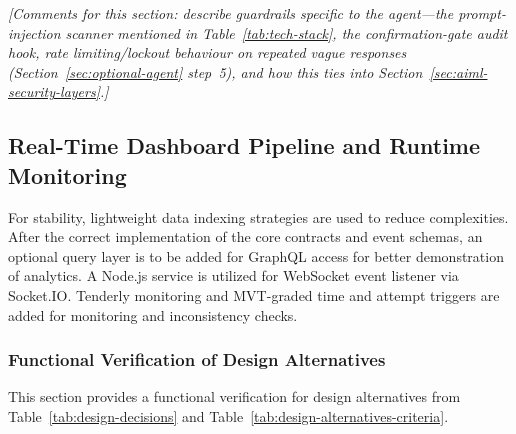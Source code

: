 \documentclass[12pt,a4paper]{report}
\begin{document}
\vspace{1.5cm}
\noindent\textit{[Comments for this section: describe guardrails specific to the agent---the prompt-injection scanner mentioned in Table~\ref{tab:tech-stack}, the confirmation-gate audit hook, rate limiting/lockout behaviour on repeated vague responses (Section~\ref{sec:optional-agent} step~5), and how this ties into Section~\ref{sec:aiml-security-layers}.]}
\vspace{1.5cm}


\subsection{Real-Time Dashboard Pipeline and Runtime Monitoring}
\label{sec:realtime}

For stability, lightweight data indexing strategies are used to reduce complexities. After the correct implementation of the core contracts and event schemas, an optional query layer is to be added for GraphQL access for better demonstration of analytics. A Node.js service is utilized for WebSocket event listener via Socket.IO. Tenderly monitoring and MVT-graded time and attempt triggers are added for monitoring and inconsistency checks.



\subsubsection{Functional Verification of Design Alternatives}
\label{sec:design-alternative-verification}

This section provides a functional verification for design alternatives from Table~\ref{tab:design-decisions} and Table~\ref{tab:design-alternatives-criteria}.
\end{document}

